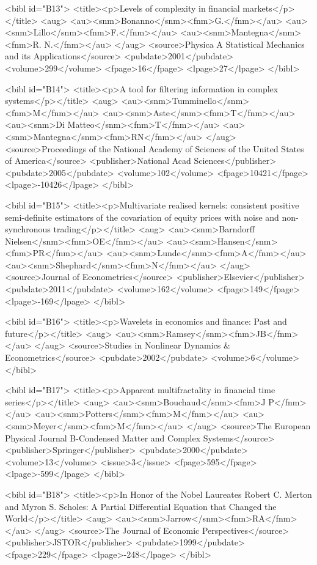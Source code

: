 \documentclass{article}
\begin{document}
{<bibl id="B13">
  <title><p>{Levels of complexity in financial markets}</p></title>
  <aug>
    <au><snm>{Bonanno}</snm><fnm>G.</fnm></au>
    <au><snm>{Lillo}</snm><fnm>F.</fnm></au>
    <au><snm>{Mantegna}</snm><fnm>R. N.</fnm></au>
  </aug>
  <source>Physica A Statistical Mechanics and its Applications</source>
  <pubdate>2001</pubdate>
  <volume>299</volume>
  <fpage>16</fpage>
  <lpage>27</lpage>
</bibl>

<bibl id="B14">
  <title><p>A tool for filtering information in complex systems</p></title>
  <aug>
    <au><snm>Tumminello</snm><fnm>M</fnm></au>
    <au><snm>Aste</snm><fnm>T</fnm></au>
    <au><snm>Di Matteo</snm><fnm>T</fnm></au>
    <au><snm>Mantegna</snm><fnm>RN</fnm></au>
  </aug>
  <source>Proceedings of the National Academy of Sciences of the United States
  of America</source>
  <publisher>National Acad Sciences</publisher>
  <pubdate>2005</pubdate>
  <volume>102</volume>
  <fpage>10421</fpage>
  <lpage>-10426</lpage>
</bibl>

<bibl id="B15">
  <title><p>Multivariate realised kernels: consistent positive semi-definite
  estimators of the covariation of equity prices with noise and non-synchronous
  trading</p></title>
  <aug>
    <au><snm>Barndorff Nielsen</snm><fnm>OE</fnm></au>
    <au><snm>Hansen</snm><fnm>PR</fnm></au>
    <au><snm>Lunde</snm><fnm>A</fnm></au>
    <au><snm>Shephard</snm><fnm>N</fnm></au>
  </aug>
  <source>Journal of Econometrics</source>
  <publisher>Elsevier</publisher>
  <pubdate>2011</pubdate>
  <volume>162</volume>
  <fpage>149</fpage>
  <lpage>-169</lpage>
</bibl>

<bibl id="B16">
  <title><p>Wavelets in economics and finance: Past and future</p></title>
  <aug>
    <au><snm>Ramsey</snm><fnm>JB</fnm></au>
  </aug>
  <source>Studies in Nonlinear Dynamics \& Econometrics</source>
  <pubdate>2002</pubdate>
  <volume>6</volume>
</bibl>

<bibl id="B17">
  <title><p>Apparent multifractality in financial time series</p></title>
  <aug>
    <au><snm>Bouchaud</snm><fnm>J P</fnm></au>
    <au><snm>Potters</snm><fnm>M</fnm></au>
    <au><snm>Meyer</snm><fnm>M</fnm></au>
  </aug>
  <source>The European Physical Journal B-Condensed Matter and Complex
  Systems</source>
  <publisher>Springer</publisher>
  <pubdate>2000</pubdate>
  <volume>13</volume>
  <issue>3</issue>
  <fpage>595</fpage>
  <lpage>-599</lpage>
</bibl>

<bibl id="B18">
  <title><p>In Honor of the Nobel Laureates Robert C. Merton and Myron S.
  Scholes: A Partial Differential Equation that Changed the World</p></title>
  <aug>
    <au><snm>Jarrow</snm><fnm>RA</fnm></au>
  </aug>
  <source>The Journal of Economic Perspectives</source>
  <publisher>JSTOR</publisher>
  <pubdate>1999</pubdate>
  <fpage>229</fpage>
  <lpage>-248</lpage>
</bibl>

}
\end{document}
